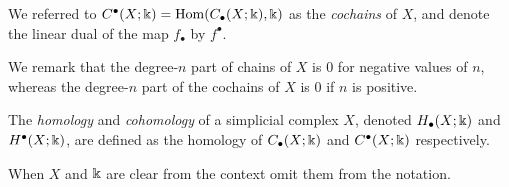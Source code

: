We referred to $C^\bullet(X; \Bbbk) = \mathrm{Hom}(C_\bullet(X; \Bbbk), \Bbbk)$ as the \textit{cochains} of $X$, and denote the linear dual of the map $f_\bullet$ by $f^\bullet$.

We remark that the degree-$n$ part of chains of $X$ is $0$ for negative values of $n$, whereas the degree-$n$ part of the cochains of $X$ is $0$ if $n$ is positive.

The \textit{homology} and \textit{cohomology} of a simplicial complex $X$, denoted $H_\bullet(X; \Bbbk)$ and $H^\bullet(X; \Bbbk)$, are defined as the homology of $C_\bullet(X; \Bbbk)$ and $C^\bullet(X; \Bbbk)$ respectively.

When $X$ and $\Bbbk$ are clear from the context omit them from the notation.